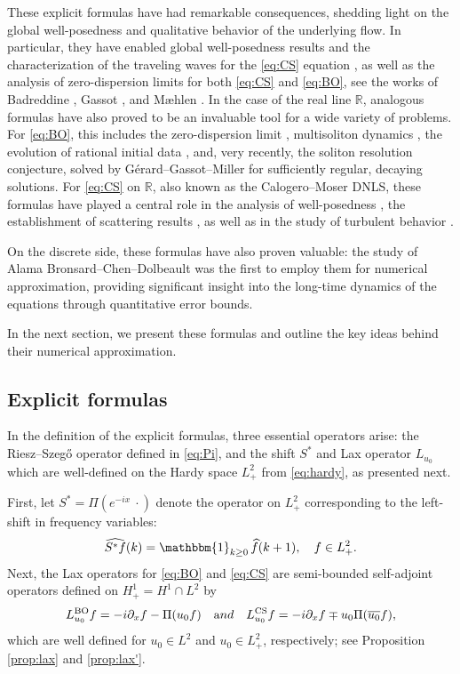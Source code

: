 \documentclass [11pt] {article}
\newcommand{\<}{\langle}
\renewcommand{\>}{\rangle}
\newcommand{\wh}[1]{\widehat{#1}}
\begin{document}
These explicit formulas have had remarkable consequences, shedding light on the global well-posedness and qualitative behavior of the underlying flow. 
In particular, they have enabled global well-posedness results and the characterization of the traveling waves for the \eqref{eq:CS} equation \cite{Badreddine24, Badreddine25}, as well as the analysis of zero-dispersion limits for both \eqref{eq:CS} and \eqref{eq:BO}, see the works of Badreddine \cite{badreddine2024zero}, Gassot \cite{Gassot}, and M{\ae}hlen \cite{maehlen2025zero}.
In the case of the real line $\mathbb{R}$, analogous formulas have also proved to be an invaluable tool for a wide variety of problems. 
For \eqref{eq:BO}, this includes the zero-dispersion limit \cite{GGM24b,Gerard25}, multisoliton dynamics \cite{Sun}, the evolution of rational initial data \cite{GGM24a}, and, very recently, the soliton resolution conjecture, solved by Gérard--Gassot--Miller \cite{GGM26} for sufficiently regular, decaying solutions.  
For \eqref{eq:CS} on $\mathbb{R}$, also known as the Calogero--Moser DNLS, these formulas have played a central role in the analysis of well-posedness \cite{KLV25}, the establishment of scattering results \cite{chen2025scattering}, as well as in the study of turbulent behavior \cite{HK24}.

On the discrete side, these formulas have also proven valuable: the study of Alama Bronsard--Chen--Dolbeault \cite{ABCD24} was the first to employ them for numerical approximation, providing significant insight into the long-time dynamics of the equations through quantitative error bounds.

In the next section, we present these formulas and outline the key ideas behind their numerical approximation.

\subsection{Explicit formulas}
In the definition of the explicit formulas, three essential operators arise: the Riesz--Szeg\H{o} operator defined in \eqref{eq:Pi}, and the shift $S^*$ and Lax operator $L_{u_0}$ which are well-defined on the Hardy space $L^2_{+}$ from \eqref{eq:hardy}, as presented next. 

First, let $S^* = \Pi (e^{-ix}\ \cdot)$ denote the operator on $L^2_+$ corresponding to the left-shift in frequency variables:
\[
\wh{S^*f}(k) = \mathbbm{1}_{k\ge 0}\, \wh{f}(k+1), \quad f \in L^2_{+}.
\]
Next, the Lax operators for \eqref{eq:BO} and \eqref{eq:CS} are semi-bounded self-adjoint operators defined on $H^1_{+} = H^1 \cap L^2$ by
\begin{equation}\label{eq:lax-ops}
 L_{u_0}^{\text{BO}}f = -i\partial_xf - \Pi(u_0f) \quad {\text and} \quad
L_{u_0}^\text{CS} f = -i\partial_xf \mp u_0 \Pi(\overline{u_0}f),
\end{equation}
which are well defined for $u_0 \in L^2$ and $u_0 \in L^2_{+}$, respectively; see Proposition \ref{prop:lax} and \ref{prop:lax'}.
\end{document}
